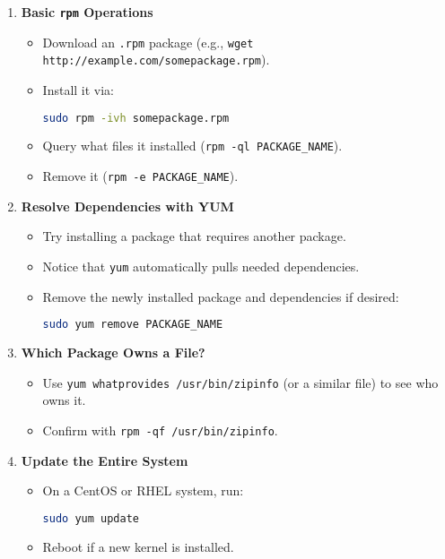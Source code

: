 \documentclass[a4paper]{report}
\begin{document}
\begin{enumerate}
    \item \textbf{Basic \texttt{rpm} Operations}
    \begin{itemize}
        \item Download an \texttt{.rpm} package (e.g., \texttt{wget http://example.com/somepackage.rpm}).
        \item Install it via:
        \begin{lstlisting}[language=bash]
sudo rpm -ivh somepackage.rpm
        \end{lstlisting}
        \item Query what files it installed (\texttt{rpm -ql PACKAGE\_NAME}).
        \item Remove it (\texttt{rpm -e PACKAGE\_NAME}).
    \end{itemize}

    \item \textbf{Resolve Dependencies with YUM}
    \begin{itemize}
        \item Try installing a package that requires another package.
        \item Notice that \texttt{yum} automatically pulls needed dependencies.
        \item Remove the newly installed package and dependencies if desired:
        \begin{lstlisting}[language=bash]
sudo yum remove PACKAGE_NAME
        \end{lstlisting}
    \end{itemize}

    \item \textbf{Which Package Owns a File?}
    \begin{itemize}
        \item Use \texttt{yum whatprovides /usr/bin/zipinfo} (or a similar file) to see who owns it.
        \item Confirm with \texttt{rpm -qf /usr/bin/zipinfo}.
    \end{itemize}

    \item \textbf{Update the Entire System}
    \begin{itemize}
        \item On a CentOS or RHEL system, run:
        \begin{lstlisting}[language=bash]
sudo yum update
        \end{lstlisting}
        \item Reboot if a new kernel is installed.
    \end{itemize}


\end{enumerate}
\end{document}
